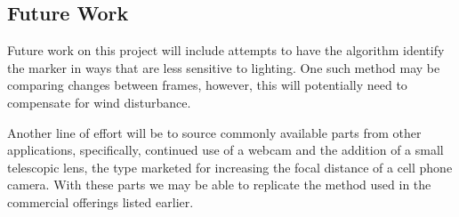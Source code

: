 \documentclass[conference]{IEEEtran}
\begin{document}
\subsection{Future Work}

Future work on this project will include attempts to have the algorithm identify the marker in ways that are less sensitive to lighting.
One such method may be comparing changes between frames,
however, this will potentially need to compensate for wind disturbance.

Another line of effort will be to source commonly available parts from other applications, specifically, continued use of a webcam and the addition of a small telescopic lens, the type marketed for increasing the focal distance of a cell phone camera.
With these parts we may be able to replicate the method used in the commercial offerings listed earlier.





\end{document}
